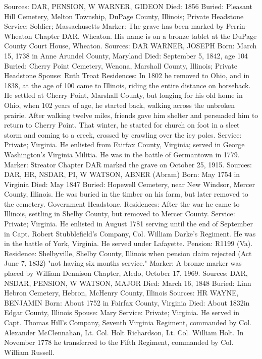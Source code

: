 Sources: DAR, PENSION, W 
WARNER, GIDEON
Died: 1856 
Buried: Pleasant Hill Cemetery, Melton Township, DuPage County, Illinois; Private Headstone
Service: Soldier; Massachusetts
Marker: The grave has been marked by Perrin-Wheaton Chapter DAR, Wheaton. His name is on a bronze tablet at the DuPage County Court House, Wheaton. 
Sources: DAR 
WARNER, JOSEPH 
Born: March 15, 1738 in Anne Arundel County, Maryland
Died:  September 5, 1842, age 104 
Buried: Cherry Point Cemetery, Wenona, Marshall County, Illinois; Private Headstone 
Spouse: Ruth Troat 
Residences: In 1802 he removed to Ohio, and in 1838, at the age of 100 came to Illinois, riding the entire distance on horseback. He settled at Cherry Point, Marshall County, but longing for his old home in Ohio, when 102 years of age, he started back, walking across the unbroken prairie. After walking twelve miles, friends gave him shelter and persuaded him to return to Cherry Point. That winter, he started for church on foot in a sleet storm and coming to a creek, crossed by crawling over the icy poles. 
Service: Private; Virginia. He enlisted from Fairfax County, Virginia; served in George Washington's Virginia Militia. He was in the battle of Germantown in 1779. 
Marker: Streator Chapter DAR marked the grave on October 25, 1915. 
Sources: DAR, HR, NSDAR, PI, W 
WATSON, ABNER (Abram) 
Born: May 1754 in Virginia 
Died: May 1847 
Buried: Hopewell Cemetery, near New Windsor, Mercer County, Illinois. He was buried in the timber on his farm, but later removed to the cemetery. Government Headstone.
Residences: After the war he came to Illinois, settling in Shelby County, but re­moved to Mercer County. 
Service: Private; Virginia. He enlisted in August 1781 serving until the end of September in Capt. Robert Stubblefield's Company, Col. William Darke's Regiment. He was in the battle of York, Virginia. He served under Lafayette. 
Pension: R1199 (Va). Residence: Shelbyville, Shelby County, Illinois when pen­sion claim rejected (Act June 7, 1832) "not having six months service." 
Marker: A bronze marker was placed by William Dennison Chapter, Aledo, October 17, 1969. 
Sources: DAR, NSDAR, PENSION, W 
WATSON, MAJOR
Died: March 16, 1848 
Buried: Linn Hebron Cemetery, Hebron, McHenry County, Illinois 
Sources: HR 
WAYNE, BENJAMIN 
Born: About 1752 in Fairfax County, Virginia
Died: About 1832in Edgar County, Illinois 
Spouse: Mary
Service: Private; Virginia. He served in Capt. Thomas Hill's Company, Seventh Virginia Regiment, commanded by Col. Alexander McClennahan, Lt. Col. Holt Richardson, Lt. Col. William Holt. In November 1778 he transferred to the Fifth Regiment, commanded by Col. William Russell. 
